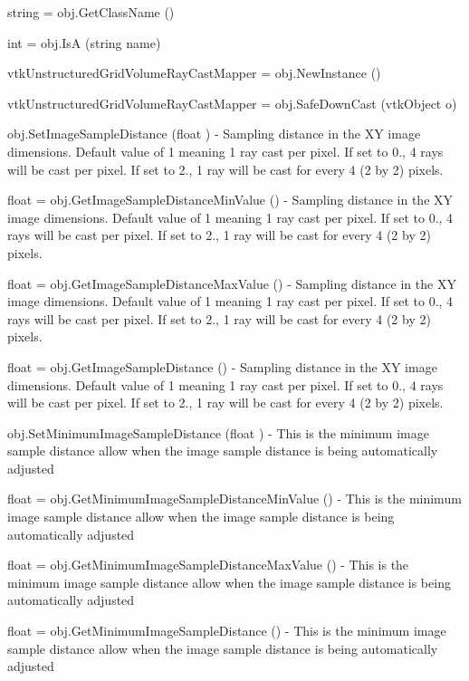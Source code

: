 \begin{DoxyItemize}
\item {\ttfamily string = obj.\-Get\-Class\-Name ()}  
\item {\ttfamily int = obj.\-Is\-A (string name)}  
\item {\ttfamily vtk\-Unstructured\-Grid\-Volume\-Ray\-Cast\-Mapper = obj.\-New\-Instance ()}  
\item {\ttfamily vtk\-Unstructured\-Grid\-Volume\-Ray\-Cast\-Mapper = obj.\-Safe\-Down\-Cast (vtk\-Object o)}  
\item {\ttfamily obj.\-Set\-Image\-Sample\-Distance (float )} -\/ Sampling distance in the X\-Y image dimensions. Default value of 1 meaning 1 ray cast per pixel. If set to 0., 4 rays will be cast per pixel. If set to 2., 1 ray will be cast for every 4 (2 by 2) pixels.  
\item {\ttfamily float = obj.\-Get\-Image\-Sample\-Distance\-Min\-Value ()} -\/ Sampling distance in the X\-Y image dimensions. Default value of 1 meaning 1 ray cast per pixel. If set to 0., 4 rays will be cast per pixel. If set to 2., 1 ray will be cast for every 4 (2 by 2) pixels.  
\item {\ttfamily float = obj.\-Get\-Image\-Sample\-Distance\-Max\-Value ()} -\/ Sampling distance in the X\-Y image dimensions. Default value of 1 meaning 1 ray cast per pixel. If set to 0., 4 rays will be cast per pixel. If set to 2., 1 ray will be cast for every 4 (2 by 2) pixels.  
\item {\ttfamily float = obj.\-Get\-Image\-Sample\-Distance ()} -\/ Sampling distance in the X\-Y image dimensions. Default value of 1 meaning 1 ray cast per pixel. If set to 0., 4 rays will be cast per pixel. If set to 2., 1 ray will be cast for every 4 (2 by 2) pixels.  
\item {\ttfamily obj.\-Set\-Minimum\-Image\-Sample\-Distance (float )} -\/ This is the minimum image sample distance allow when the image sample distance is being automatically adjusted  
\item {\ttfamily float = obj.\-Get\-Minimum\-Image\-Sample\-Distance\-Min\-Value ()} -\/ This is the minimum image sample distance allow when the image sample distance is being automatically adjusted  
\item {\ttfamily float = obj.\-Get\-Minimum\-Image\-Sample\-Distance\-Max\-Value ()} -\/ This is the minimum image sample distance allow when the image sample distance is being automatically adjusted  
\item {\ttfamily float = obj.\-Get\-Minimum\-Image\-Sample\-Distance ()} -\/ This is the minimum image sample distance allow when the image sample distance is being automatically adjusted  

\end{DoxyItemize}
